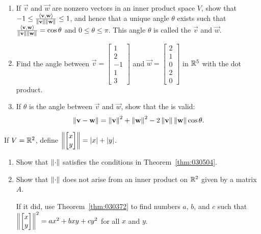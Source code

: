 \documentclass{ximera}
\begin{document}
\begin{problem} \label{ex:10_1_31}
\begin{enumerate} 
\item If $\vec{v}$ and $\vec{w}$ are nonzero vectors in an inner product space $V$, show that
$-1 \leq \frac{\langle \mathbf{v}, \mathbf{w} \rangle}{\left\lVert \mathbf{v} \right\rVert \left\lVert \mathbf{w} \right\rVert} \leq 1$, and hence that a unique angle $\theta$ exists such that \newline $\frac{\langle \mathbf{v}, \mathbf{w} \rangle}{\left\lVert \mathbf{v} \right\rVert \left\lVert \mathbf{w} \right\rVert} = \cos \theta$ and $0 \leq \theta \leq \pi$. This angle $\theta$ is called the
 $\vec{v}$ and $\vec{w}$.

\item Find the angle between $\vec{v} = \begin{bmatrix}1\\ 2\\ -1\\ 1\\ 3\end{bmatrix}$ and $\vec{w} = \begin{bmatrix}2\\ 1\\ 0\\ 2\\ 0\end{bmatrix}$ in $\mathbb{R}^5$ with the dot product.

\item If $\theta$ is the angle between $\vec{v}$ and $\vec{w}$, show that the  is valid:
\begin{equation*}
\left\lVert \mathbf{v} - \mathbf{w} \right\rVert = \left\lVert \mathbf{v} \right\rVert ^2 + \left\lVert \mathbf{w} \right\rVert ^2 - 2\left\lVert \mathbf{v} \right\rVert \left\lVert \mathbf{w} \right\rVert \cos \theta.
\end{equation*}
\end{enumerate}
\end{problem}

\begin{problem}\label{prob:inner_prod_32}
If $V = \mathbb{R}^2$, define $\left\lVert\begin{bmatrix}x\\ y\end{bmatrix}\right\rVert = |x| + |y|$.

\begin{enumerate} 
\item Show that $\left\lVert\cdot\right\rVert$ satisfies the conditions in Theorem~\ref{thm:030504}.

\item Show that $\left\lVert\cdot\right\rVert$ does not arise from an inner product on $\mathbb{R}^2$ given by a matrix $A$. 
\begin{hint}
    If it did, use Theorem~\ref{thm:030372} to find numbers $a$, $b$, and $c$ such that $\left\lVert\begin{bmatrix}x\\ y\end{bmatrix}\right\rVert^{2} = ax^{2} + bxy + cy^{2}$ for all $x$ and $y$.
\end{hint}

\end{enumerate}
\end{problem}
\end{document}
